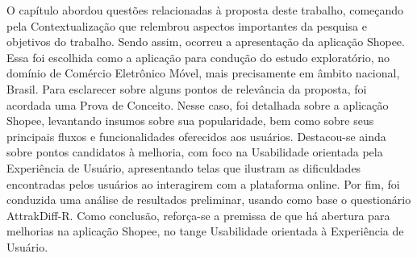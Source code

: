 O capítulo abordou questões relacionadas à proposta deste trabalho, começando pela Contextualização que relembrou aspectos importantes da pesquisa e objetivos do trabalho. Sendo assim, ocorreu a apresentação da aplicação Shopee. Essa foi escolhida como a aplicação para condução do estudo exploratório, no domínio de Comércio Eletrônico Móvel, mais precisamente em âmbito nacional, Brasil. Para esclarecer sobre alguns pontos de relevância da proposta, foi acordada uma Prova de Conceito. Nesse caso, foi detalhada sobre a aplicação Shopee, levantando insumos sobre sua popularidade, bem como sobre seus principais fluxos e funcionalidades oferecidos aos usuários. Destacou-se ainda sobre pontos candidatos à melhoria, com foco na Usabilidade orientada pela Experiência de Usuário, apresentando telas que ilustram as dificuldades encontradas pelos usuários ao interagirem com a plataforma online. Por fim, foi conduzida uma análise de resultados preliminar, usando como base o questionário AttrakDiff-R. Como conclusão, reforça-se a premissa de que há abertura para melhorias na aplicação Shopee, no tange Usabilidade orientada à Experiência de Usuário.


